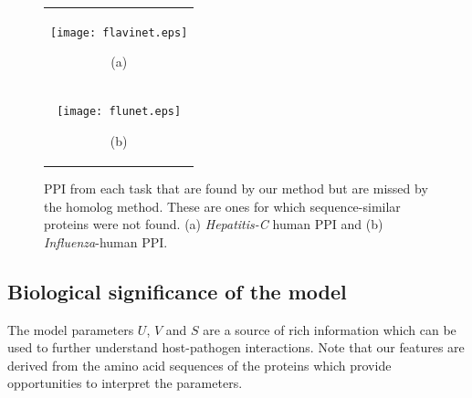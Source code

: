 \documentclass{bioinfo}
\begin{document}
\begin{figure}
\begin{tabular}{c}
\begin{minipage}{\textwidth}
\begin{center}
\texttt{[image: flavinet.eps]}
\end{center}
\end{minipage}
(a)
\\
\begin{minipage}{\textwidth}
\begin{center}
\texttt{[image: flunet.eps]}
\end{center}
\end{minipage}
(b)
\end{tabular}
\caption{PPI from each task that are found by our method but are missed by the homolog method. These are ones for which sequence-similar proteins were not found. (a) \textit{Hepatitis-C} human PPI and (b) \textit{Influenza}-human PPI.}
\label{fig:network}
\end{figure}


\subsection{Biological significance of the model}
\label{bioanalysis}
The model parameters $U$, $V$ and $S$ are a source of rich information which can be used to further understand host-pathogen
interactions. Note that our features are derived from the amino acid sequences of the proteins which provide
opportunities to interpret the parameters.
\end{document}
